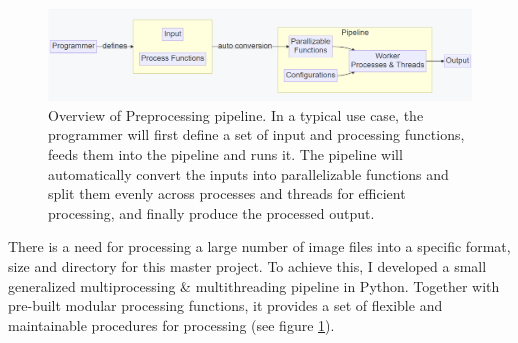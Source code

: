 \begin{figure}
    \centering
    \includegraphics[width=1.0\textwidth]{images/introduction/preprocess_pipeline.png}
    \caption{Overview of Preprocessing pipeline. In a typical use case, the programmer will first define a set of input and processing functions, feeds them into the pipeline and runs it. The pipeline will automatically convert the inputs into parallelizable functions and split them evenly across processes and threads for efficient processing, and finally produce the processed output.} 
    \label{fig:preprocess_pipeline}
\end{figure}

There is a need for processing a large number of image files into a specific format, size and directory for this master project. To achieve this, I developed a small generalized multiprocessing \& multithreading pipeline in Python\cite{WelcomePythonOrg}. Together with pre-built modular processing functions, it provides a set of flexible and maintainable procedures for processing (see figure \ref{fig:preprocess_pipeline}).







